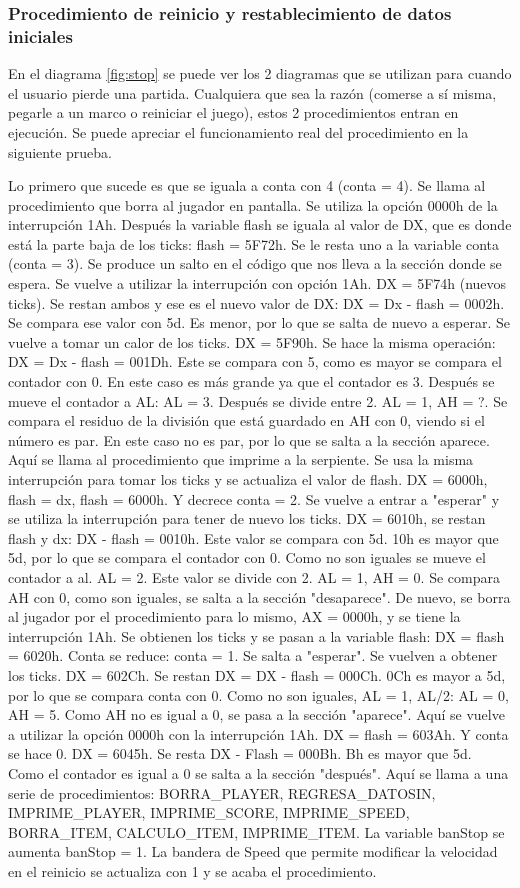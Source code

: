 \documentclass[12pt]{article}
\begin{document}
\subsubsection*{Procedimiento de reinicio y restablecimiento de datos iniciales}
En el diagrama \ref{fig:stop} se puede ver los 2 diagramas que se utilizan para cuando el usuario pierde una partida. Cualquiera que sea la razón (comerse a sí misma, pegarle a un marco o reiniciar el juego), estos 2 procedimientos entran en ejecución. Se puede apreciar el funcionamiento real del procedimiento en la siguiente prueba. 

Lo primero que sucede es que se iguala a conta con 4 (conta = 4). Se llama al procedimiento que borra al jugador en pantalla. Se utiliza la opción 0000h de la interrupción 1Ah. Después la variable flash se iguala al valor de DX, que es donde está la parte baja de los ticks: flash = 5F72h. Se le resta uno a la variable conta (conta = 3). Se produce un salto en el código que nos lleva a la sección donde se espera. Se vuelve a utilizar la interrupción con opción 1Ah. DX = 5F74h (nuevos ticks). Se restan ambos y ese es el nuevo valor de DX: DX = Dx - flash = 0002h. Se compara ese valor con 5d. Es menor, por lo que se salta de nuevo a esperar. Se vuelve a tomar un calor de los ticks. DX = 5F90h. Se hace la misma operación: DX = Dx - flash = 001Dh. Este se compara con 5, como es mayor se compara el contador con 0. En este caso es más grande ya que el contador es 3. Después se mueve el contador a AL: AL = 3. Después se divide entre 2. AL = 1, AH = ?. Se compara el residuo de la división que está guardado en AH con 0, viendo si el número es par. En este caso no es par, por lo que se salta a la sección aparece. Aquí se llama al procedimiento que imprime a la serpiente. Se usa la misma interrupción para tomar los ticks y se actualiza el valor de flash. DX = 6000h, flash = dx, flash = 6000h. Y decrece conta = 2. Se vuelve a entrar a "esperar" y se utiliza la interrupción para tener de nuevo los ticks. DX = 6010h, se restan flash y dx: DX - flash = 0010h. Este valor se compara con 5d. 10h es mayor que 5d, por lo que se compara el contador con 0. Como no son iguales se mueve el contador a al. AL = 2. Este valor se divide con 2. AL = 1, AH = 0. Se compara AH con 0, como son iguales, se salta a la sección "desaparece". De nuevo, se borra al jugador por el procedimiento para lo mismo, AX = 0000h, y se tiene la interrupción 1Ah. Se obtienen los ticks y se pasan a la variable flash: DX = flash = 6020h. Conta se reduce: conta = 1. Se salta a "esperar". Se vuelven a obtener los ticks. DX = 602Ch. Se restan DX = DX - flash = 000Ch. 0Ch es mayor a 5d, por lo que se compara conta con 0. Como no son iguales, AL = 1, AL/2: AL = 0, AH = 5. Como AH no es igual a 0, se pasa a la sección "aparece". Aquí se vuelve a utilizar la opción 0000h con la interrupción 1Ah. DX = flash = 603Ah. Y conta se hace 0. DX = 6045h. Se resta DX - Flash = 000Bh. Bh es mayor que 5d. Como el contador es igual a 0 se salta a la sección "después". Aquí se llama a una serie de procedimientos: BORRA\_PLAYER, REGRESA\_DATOSIN, IMPRIME\_PLAYER, IMPRIME\_SCORE, IMPRIME\_SPEED, BORRA\_ITEM, CALCULO\_ITEM, IMPRIME\_ITEM. La variable banStop se aumenta banStop = 1. La bandera de Speed que permite modificar la velocidad en el reinicio se actualiza con 1 y se acaba el procedimiento. 
\end{document}
